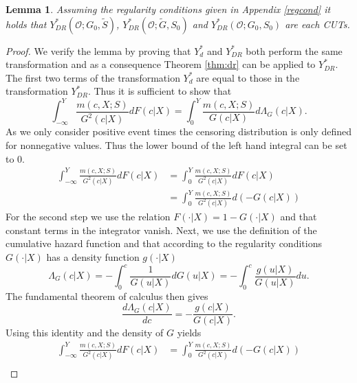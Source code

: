 \documentclass[12pt, a4paper]{scrartcl}
\theoremstyle{definition}
\theoremstyle{plain}
\newtheorem{Lemma}{Lemma}[section]
\numberwithin{equation}{section}
\numberwithin{figure}{section}
\numberwithin{table}{section}
\begin{document}
	\begin{Lemma}
		Assuming the regularity conditions given in Appendix \ref{regcond} it holds that $Y_{DR}^*(\mathcal{O}; G_0, \tilde{S})$, $Y_{DR}^*(\mathcal{O}; \tilde{G}, S_0)$ and $Y_{DR}^*(\mathcal{O}; G_0, S_0)$ are each CUTs.
	\end{Lemma}
	\begin{proof}
		We verify the lemma by proving that $Y_d^*$ and $Y_{DR}^*$ both perform the same transformation and as a consequence Theorem \ref{thm:dr} can be applied to $Y_{DR}^*$.
		The first two terms of the transformation $Y_d^*$ are equal to those in the transformation $Y_{DR}^*$.
		Thus it is sufficient to show that
		\begin{equation*}
		\int_{-\infty}^{Y}\frac{m(c,X;S)}{G^2(c\vert X)}dF(c\vert X) = \int_{0}^{Y} \frac{m(c,X;S)}{G(c \vert X)} d\Lambda_G(c \vert X).
		\end{equation*}
		As we only consider positive event times the censoring distribution is only defined for nonnegative values.
		Thus the lower bound of the left hand integral can be set to 0.
		\begin{equation*}
		\begin{split}
		\int_{-\infty}^{Y}\frac{m(c,X;S)}{G^2(c\vert X)}dF(c\vert X) &={} \int_{0}^{Y}\frac{m(c,X;S)}{G^2(c\vert X)}dF(c\vert X)\\
		&={} \int_{0}^{Y}\frac{m(c,X;S)}{G^2(c\vert X)}d(-G(c\vert X))
		\end{split}
		\end{equation*}
		For the second step we use the relation $F(\cdot\vert X)= 1-G(\cdot\vert X)$ and that constant terms in the integrator vanish.
		Next, we use the definition of the cumulative hazard function and that according to the regularity conditions $G(\cdot \vert X)$ has a density function $g(\cdot \vert X)$
		\begin{equation*}
			\Lambda_G(c \vert X) = - \int_{0}^{c}\frac{1}{G(u\vert X)}dG(u\vert X) = - \int_{0}^{c}\frac{g(u\vert X)}{G(u\vert X)}du.
		\end{equation*}
		The fundamental theorem of calculus then gives
		\begin{equation*}
		\frac{d\Lambda_G(c \vert X)}{dc} = -\frac{g(c\vert X)}{G(c\vert X)}.
		\end{equation*}
		Using this identity and the density of $G$ yields
		\begin{equation*}
		\begin{split}
		\int_{-\infty}^{Y}\frac{m(c,X;S)}{G^2(c\vert X)}dF(c\vert X) &={} \int_{0}^{Y}\frac{m(c,X;S)}{G^2(c\vert X)}d(-G(c\vert X))\\

\end{split}
\end{equation*}
\end{proof}
\end{document}
